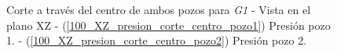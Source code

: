 \documentclass[10pt,a4paper,final]{article}
\begin{document}
\begin{figure}[H]
   \centering
   \hspace{0.1\linewidth}
    \caption{Corte a través del centro de ambos pozos para \emph{G1} - Vista en el plano XZ - (\ref{100_XZ_presion_corte_centro_pozo1}) Presión pozo 1. - (\ref{100_XZ_presion_corte_centro_pozo2})  Presión pozo 2.}
   \label{100_XZ_presion_corte_centro}                %
\end{figure}
\end{document}
